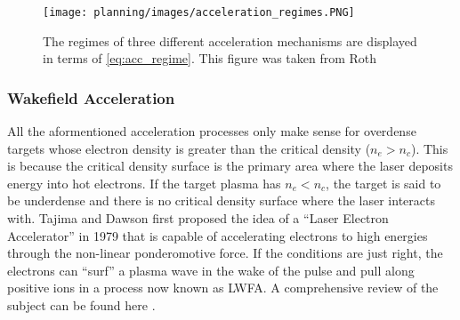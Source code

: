 \begin{figure}
	\centering 
	\texttt{[image: planning/images/acceleration\_regimes.PNG]}
	\caption{The regimes of three different acceleration mechanisms are displayed in terms of \cref{eq:acc_regime}. This figure was taken from Roth \cite{Lezhnin_2015_PoP}}
	\label{fig:regimes}
\end{figure}

\subsubsection{Wakefield Acceleration}
All the aformentioned acceleration processes only make sense for overdense targets whose electron density is greater than the critical density ($n_e > n_c$). This is because the critical density surface is the primary area where the laser deposits energy into hot electrons. If the target plasma has $n_e < n_c$, the target is said to be underdense and there is no critical density surface where the laser interacts with. Tajima and Dawson \cite{Tajima_1979_PRL} first proposed the idea of a ``Laser Electron Accelerator'' in 1979 that is capable of accelerating electrons to high energies through the non-linear ponderomotive force. If the conditions are just right, the electrons can ``surf'' a plasma wave in the wake of the pulse and pull along positive ions in a process now known as \gls{LWFA}. A comprehensive review of the subject can be found here \cite{Esarey_2009_LPA}.


